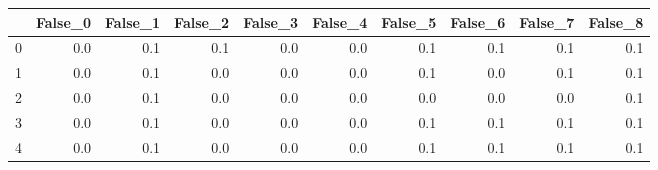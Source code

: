 \begin{tabular}{lrrrrrrrrr}
\toprule
{} &  False\_0 &  False\_1 &  False\_2 &  False\_3 &  False\_4 &  False\_5 &  False\_6 &  False\_7 &  False\_8 \\ \hline
\midrule
0 &      0.0 &      0.1 &      0.1 &      0.0 &      0.0 &      0.1 &      0.1 &      0.1 &      0.1 \\ \hline
1 &      0.0 &      0.1 &      0.0 &      0.0 &      0.0 &      0.1 &      0.0 &      0.1 &      0.1 \\ \hline
2 &      0.0 &      0.1 &      0.0 &      0.0 &      0.0 &      0.0 &      0.0 &      0.0 &      0.1 \\ \hline
3 &      0.0 &      0.1 &      0.0 &      0.0 &      0.0 &      0.1 &      0.1 &      0.1 &      0.1 \\ \hline
4 &      0.0 &      0.1 &      0.0 &      0.0 &      0.0 &      0.1 &      0.1 &      0.1 &      0.1 \\ \hline
\bottomrule
\end{tabular}
